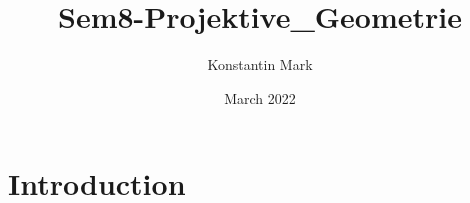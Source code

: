 \documentclass{article}
\title{Sem8-Projektive_Geometrie}
\author{Konstantin Mark}
\date{March 2022}
\begin{document}
\maketitle

\section{Introduction}
\end{document}
